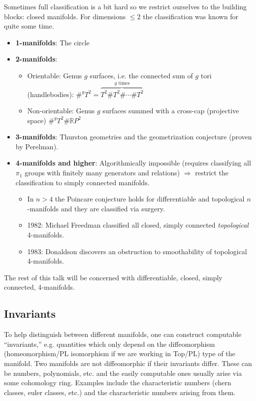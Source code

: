 \documentclass[12pt, onecolumn]{article}
\begin{document}
\noindent Sometimes full classification is a bit hard so we restrict ourselves to the building blocks: closed manifolds.  For dimensions $\leq 2$ the classification was known for quite some time.
\begin{itemize}
\item \textbf{1-manifolds}: The circle
\item \textbf{2-manifolds}:
\begin{itemize}
\item Orientable: Genus $g$ surfaces, i.e. the connected sum of $g$ tori (handlebodies): $\#^gT^2=\overbrace{T^2 \# T^2 \# \cdots \# T^2}^{\text{$g$ times}}$
\item Non-orientable: Genus $g$ surfaces summed with a cross-cap (projective space) $\#^gT^2 \# \mathbb{R}P^2$
\end{itemize}
\item \textbf{3-manifolds}: Thurston geometries and the geometrization conjecture (proven by Perelman).
\item \textbf{4-manifolds and higher}: Algorithmically impossible (requires classifying all $\pi_{1}$ groups with finitely many generators and relations) $\Rightarrow$ restrict the classification to simply connected manifolds.
\begin{itemize}
\item In $n>4$ the Poincare conjecture holds for differentiable and topological $n$-manifolds and they are classified via surgery.
\item 1982: Michael Freedman classified all closed, simply connected \textit{topological} 4-manifolds.
\item 1983: Donaldson discovers an obstruction to smoothability of topological 4-manifolds.
\end{itemize}
\end{itemize}
The rest of this talk will be concerned with differentiable, closed, simply connected, 4-manifolds.

\subsection{Invariants}
To help distinguish between different manifolds, one can construct computable ``invariants,'' e.g. quantities which only depend on the diffeomorphism (homeomorphism/PL isomorphism if we are working in Top/PL) type of the manifold.  Two manifolds are not diffeomorphic if their invariants differ.  These can be numbers, polynomials, etc. and the easily computable ones usually arise via some cohomology ring.  Examples include the characteristic numbers (chern classes, euler classes, etc.) and the characteristic numbers arising from them.
\end{document}
